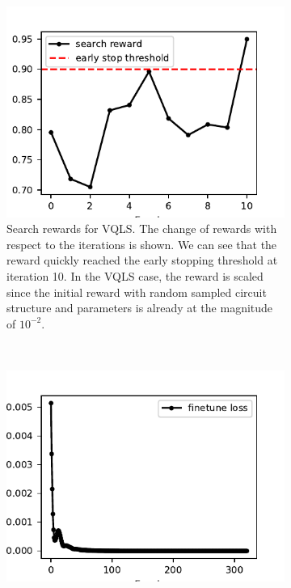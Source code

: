 \documentclass[a4paper,onecolumn,11pt]{quantumarticle}
\begin{document}
\begin{figure}[H]
    \centering
    \begin{subfigure}[t]{0.48\linewidth}
        \includegraphics[width=\linewidth]{Figures/fig_vqls_4q_search_rewards.pdf}
        \caption{Search rewards for VQLS. The change of rewards with respect to the iterations is shown. We can see that the reward quickly reached the early stopping threshold at iteration 10. In the VQLS case, the reward is scaled since the initial reward with random sampled circuit structure and parameters is already at the magnitude of $10^{-2}$.}
        \label{fig:vqls_4q_search}
    \end{subfigure}
    ~ %
    \begin{subfigure}[t]{0.48\linewidth}
        \includegraphics[width=\linewidth]{Figures/fig_vqls_4q_finetune.pdf}

\end{subfigure}
\end{figure}
\end{document}
